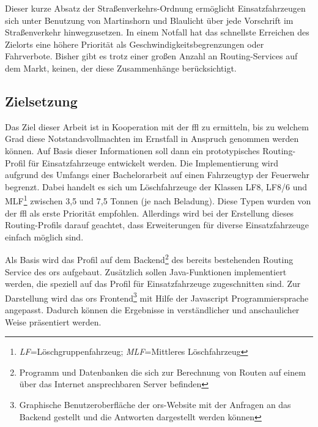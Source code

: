 \vspace{1.2cm}

Dieser kurze Absatz der Straßenverkehrs-Ordnung ermöglicht Einsatzfahrzeugen sich unter Benutzung von Martinshorn und Blaulicht über jede Vorschrift im Straßenverkehr hinwegzusetzen.
In einem Notfall hat das schnellste Erreichen des Zielorts eine höhere Priorität als Geschwindigkeitsbegrenzungen oder Fahrverbote.
Bisher gibt es trotz einer großen Anzahl an Routing-Services auf dem Markt, keinen, der diese Zusammenhänge berücksichtigt.

\subsection{Zielsetzung}
Das Ziel dieser Arbeit ist in Kooperation mit der \gls{ffl} zu ermitteln, bis zu welchem Grad diese Notstandsvollmachten im Ernstfall in Anspruch genommen werden können.
Auf Basis dieser Informationen soll dann ein prototypisches Routing-Profil für Einsatzfahrzeuge entwickelt werden.
Die Implementierung wird aufgrund des Umfangs einer Bachelorarbeit auf einen Fahrzeugtyp der Feuerwehr begrenzt.
Dabei handelt es sich um Löschfahrzeuge der Klassen LF8, LF8/6 und MLF\footnote{\textit{LF}=Löschgruppenfahrzeug; \textit{MLF}=Mittleres Löschfahrzeug} zwischen 3,5 und 7,5 Tonnen (je nach Beladung).
Diese Typen wurden von der \gls{ffl} als erste Priorität empfohlen.
Allerdings wird bei der Erstellung dieses Routing-Profils darauf geachtet, dass Erweiterungen für diverse Einsatzfahrzeuge einfach möglich sind.
\vspace{0.5cm}

Als Basis wird das Profil auf dem Backend\footnote{Programm und Datenbanken die sich zur Berechnung von Routen auf einem über das Internet ansprechbaren Server befinden} des bereits bestehenden Routing Service des \gls{ors} aufgebaut.
Zusätzlich sollen Java-Funktionen implementiert werden, die speziell auf das Profil für Einsatzfahrzeuge zugeschnitten sind.
Zur Darstellung wird das \gls{ors} Frontend\footnote{Graphische Benutzeroberfläche der \gls{ors}-Website mit der Anfragen an das Backend gestellt und die Antworten dargestellt werden können} mit Hilfe der Javascript Programmiersprache angepasst.
Dadurch können die Ergebnisse in verständlicher und anschaulicher Weise präsentiert werden.
